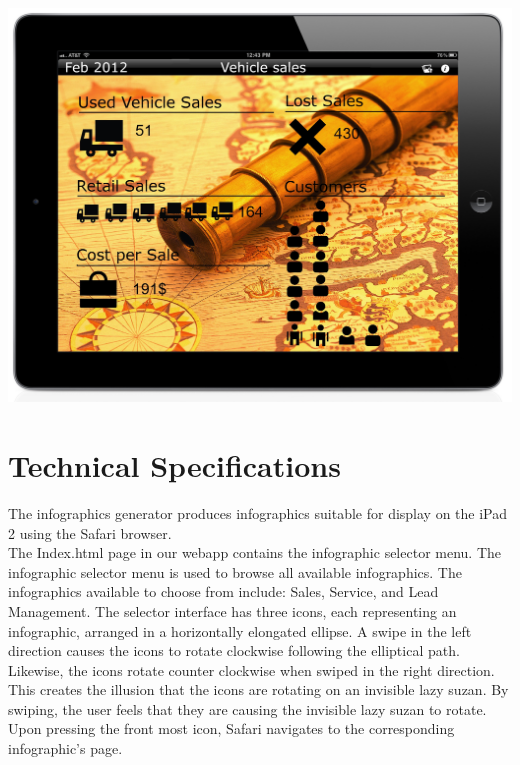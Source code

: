 \documentclass[11pt,a4paper,oneside]{article}
\begin{document}
\includegraphics[width=1\textwidth]{images/screen4.jpg}\\

\section{Technical Specifications}

The infographics generator produces infographics suitable for display on the iPad 2 using the Safari browser.\\

The Index.html page in our webapp contains the infographic selector menu. The infographic selector menu is used to browse all available infographics. The infographics available to choose from include: Sales, Service, and Lead Management. The selector interface has three icons, each representing an infographic, arranged in a horizontally elongated ellipse. A swipe in the left direction causes the icons to rotate clockwise following the elliptical path. Likewise, the icons rotate counter clockwise when swiped in the right direction. This creates the illusion that the icons are rotating on an invisible lazy suzan. By swiping, the user feels that they are causing the invisible lazy suzan to rotate. Upon pressing the front most icon, Safari navigates to the corresponding infographic's page.\\
\end{document}
